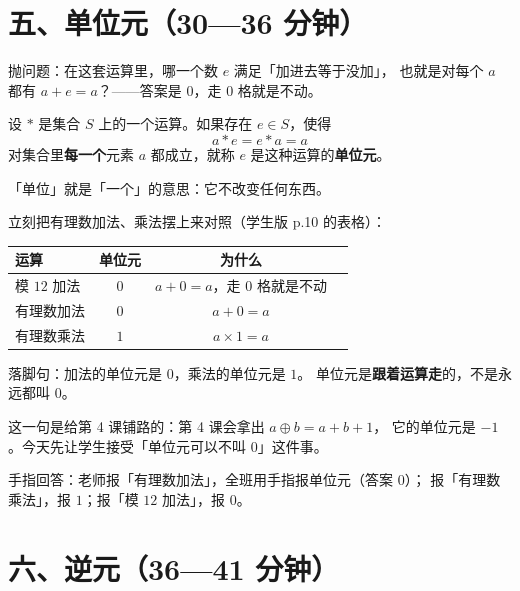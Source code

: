 \section*{五、单位元（30—36 分钟）}

抛问题：在这套运算里，哪一个数 \(e\) 满足「加进去等于没加」，
也就是对每个 \(a\) 都有 \(a+e=a\)？——答案是 \(0\)，走 \(0\) 格就是不动。

\begin{definition}[单位元]
  设 \(*\) 是集合 \(S\) 上的一个运算。如果存在 \(e\in S\)，使得
  \[
    a*e=e*a=a
  \]
  对集合里\textbf{每一个}元素 \(a\) 都成立，就称 \(e\) 是这种运算的\textbf{单位元}。
\end{definition}

\begin{zhu}
  「单位」就是「一个」的意思：它不改变任何东西。
\end{zhu}

\noindent 立刻把有理数加法、乘法摆上来对照（学生版 p.10 的表格）：

\begin{center}
\begin{tabular}{@{}lccc@{}}
  \toprule
  运算 & 单位元 & 为什么 \\
  \midrule
  模 \(12\) 加法 & \(0\) & \(a+0=a\)，走 \(0\) 格就是不动 \\
  有理数加法 & \(0\) & \(a+0=a\) \\
  有理数乘法 & \(1\) & \(a\times1=a\) \\
  \bottomrule
\end{tabular}
\end{center}

\noindent 落脚句：加法的单位元是 \(0\)，乘法的单位元是 \(1\)。
单位元是\textbf{跟着运算走}的，不是永远都叫 \(0\)。

\begin{zhu}
  这一句是给第 4 课铺路的：第 4 课会拿出 \(a\oplus b=a+b+1\)，
  它的单位元是 \(-1\)。今天先让学生接受「单位元可以不叫 \(0\)」这件事。
\end{zhu}

\begin{caozuo}
  手指回答：老师报「有理数加法」，全班用手指报单位元（答案 \(0\)）；
  报「有理数乘法」，报 \(1\)；报「模 \(12\) 加法」，报 \(0\)。
\end{caozuo}

\section*{六、逆元（36—41 分钟）}

